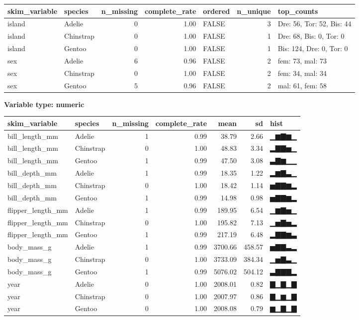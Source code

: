 \documentclass[
]{article}
\begin{document}
\begin{longtable}[]{@{}llrrlrl@{}}
\toprule
skim\_variable & species & n\_missing & complete\_rate & ordered &
n\_unique & top\_counts \\
\midrule
\endhead
island & Adelie & 0 & 1.00 & FALSE & 3 & Dre: 56, Tor: 52, Bis: 44 \\
island & Chinstrap & 0 & 1.00 & FALSE & 1 & Dre: 68, Bis: 0, Tor: 0 \\
island & Gentoo & 0 & 1.00 & FALSE & 1 & Bis: 124, Dre: 0, Tor: 0 \\
sex & Adelie & 6 & 0.96 & FALSE & 2 & fem: 73, mal: 73 \\
sex & Chinstrap & 0 & 1.00 & FALSE & 2 & fem: 34, mal: 34 \\
sex & Gentoo & 5 & 0.96 & FALSE & 2 & mal: 61, fem: 58 \\
\bottomrule
\end{longtable}

\textbf{Variable type: numeric}

\begin{longtable}[]{@{}llrrrrl@{}}
\toprule
skim\_variable & species & n\_missing & complete\_rate & mean & sd &
hist \\
\midrule
\endhead
bill\_length\_mm & Adelie & 1 & 0.99 & 38.79 & 2.66 & ▁▆▇▆▁ \\
bill\_length\_mm & Chinstrap & 0 & 1.00 & 48.83 & 3.34 & ▂▇▇▅▁ \\
bill\_length\_mm & Gentoo & 1 & 0.99 & 47.50 & 3.08 & ▃▇▆▁▁ \\
bill\_depth\_mm & Adelie & 1 & 0.99 & 18.35 & 1.22 & ▂▆▇▃▁ \\
bill\_depth\_mm & Chinstrap & 0 & 1.00 & 18.42 & 1.14 & ▅▇▇▆▂ \\
bill\_depth\_mm & Gentoo & 1 & 0.99 & 14.98 & 0.98 & ▅▇▇▆▂ \\
flipper\_length\_mm & Adelie & 1 & 0.99 & 189.95 & 6.54 & ▁▆▇▅▁ \\
flipper\_length\_mm & Chinstrap & 0 & 1.00 & 195.82 & 7.13 & ▁▅▇▅▂ \\
flipper\_length\_mm & Gentoo & 1 & 0.99 & 217.19 & 6.48 & ▂▇▇▆▃ \\
body\_mass\_g & Adelie & 1 & 0.99 & 3700.66 & 458.57 & ▅▇▇▃▂ \\
body\_mass\_g & Chinstrap & 0 & 1.00 & 3733.09 & 384.34 & ▁▅▇▃▁ \\
body\_mass\_g & Gentoo & 1 & 0.99 & 5076.02 & 504.12 & ▃▇▇▇▂ \\
year & Adelie & 0 & 1.00 & 2008.01 & 0.82 & ▇▁▇▁▇ \\
year & Chinstrap & 0 & 1.00 & 2007.97 & 0.86 & ▇▁▆▁▇ \\
year & Gentoo & 0 & 1.00 & 2008.08 & 0.79 & ▆▁▇▁▇ \\
\bottomrule
\end{longtable}
\end{document}
